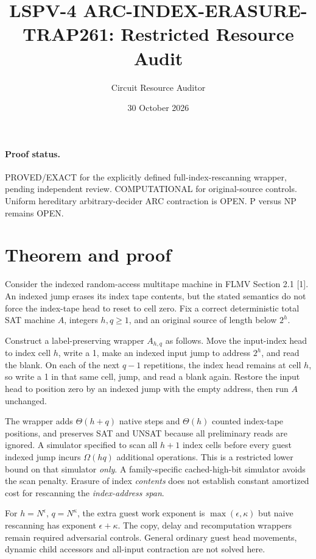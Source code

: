 \documentclass[11pt]{article}
\title{LSPV-4 ARC-INDEX-ERASURE-TRAP261: Restricted Resource Audit}
\author{Circuit Resource Auditor}
\date{30 October 2026}
\begin{document}
\maketitle

\paragraph{Proof status.}
PROVED/EXACT for the explicitly defined full-index-rescanning wrapper, pending independent review. COMPUTATIONAL for original-source controls. Uniform hereditary arbitrary-decider ARC contraction is OPEN. P versus NP remains OPEN.

\section*{Theorem and proof}
Consider the indexed random-access multitape machine in FLMV Section 2.1 [1]. An indexed jump erases its index tape contents, but the stated semantics do not force the index-tape head to reset to cell zero. Fix a correct deterministic total SAT machine $A$, integers $h,q\ge1$, and an original source of length below $2^h$.

Construct a label-preserving wrapper $A_{h,q}$ as follows. Move the input-index head to index cell $h$, write a 1, make an indexed input jump to address $2^h$, and read the blank. On each of the next $q-1$ repetitions, the index head remains at cell $h$, so write a 1 in that same cell, jump, and read a blank again. Restore the input head to position zero by an indexed jump with the empty address, then run $A$ unchanged.

The wrapper adds $\Theta(h+q)$ native steps and $\Theta(h)$ counted index-tape positions, and preserves SAT and UNSAT because all preliminary reads are ignored. A simulator specified to scan all $h+1$ index cells before every guest indexed jump incurs $\Omega(hq)$ additional operations. This is a restricted lower bound on that simulator \emph{only}. A family-specific cached-high-bit simulator avoids the scan penalty. Erasure of index \emph{contents} does not establish constant amortized cost for rescanning the \emph{index-address span}.

For $h=N^\epsilon$, $q=N^\kappa$, the extra guest work exponent is $\max(\epsilon,\kappa)$ but naive rescanning has exponent $\epsilon+\kappa$. The copy, delay and recomputation wrappers remain required adversarial controls. General ordinary guest head movements, dynamic child accessors and all-input contraction are not solved here.
\end{document}
